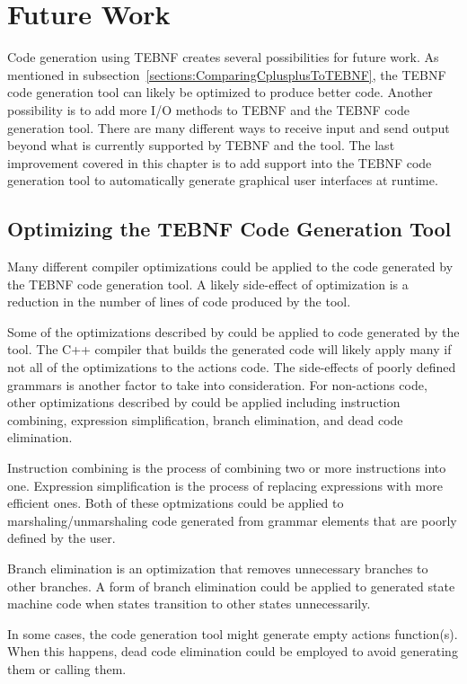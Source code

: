 \chapter{Future Work}
Code generation using TEBNF creates several possibilities for future work.  As mentioned in subsection~\ref{sections:ComparingCplusplusToTEBNF}, the TEBNF code generation tool can likely be optimized to produce better code.  Another possibility is to add more I/O methods to TEBNF and the TEBNF code generation tool.  There are many different ways to receive input and send output beyond what is currently supported by TEBNF and the tool.  The last improvement covered in this chapter is to add support into the TEBNF code generation tool to automatically generate graphical user interfaces at runtime.

\section{Optimizing the TEBNF Code Generation Tool}
Many different compiler optimizations could be applied to the code generated by the TEBNF code generation tool.  A likely side-effect of optimization is a reduction in the number of lines of code produced by the tool.

\indent
Some of the optimizations described by \cite{optimizations_01} could be applied to code generated by the tool.  The C++ compiler that builds the generated code will likely apply many if not all of the optimizations to the actions code.   The side-effects of poorly defined grammars is another factor to take into consideration.  For non-actions code, other optimizations described by \cite{optimizations_01} could be applied including instruction combining, expression simplification, branch elimination, and dead code elimination.

\indent
Instruction combining is the process of combining two or more instructions into one.  Expression simplification is the process of replacing expressions with more efficient ones.  Both of these optmizations could be applied to marshaling/unmarshaling code generated from grammar elements that are poorly defined by the user.

\indent
Branch elimination is an optimization that removes unnecessary branches to other branches.  A form of branch elimination could be applied to generated state machine code when states transition to other states unnecessarily.

\indent
In some cases, the code generation tool might generate empty actions function(s).
When this happens, dead code elimination could be employed to avoid generating them or calling them.

